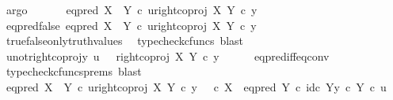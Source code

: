 \begin{isabellebody}
\ argo\isanewline
\ \ \isamarkupfalse%
\isanewline
{}\isamarkupfalse%
\isanewline
\ \ \isamarkupfalse%
\ {\isachardoublequoteopen}eq{\isacharunderscore}{\kern0pt}pred\ {\isacharparenleft}{\kern0pt}X\ {\isasymCoprod}\ Y{\isacharparenright}{\kern0pt}\ {\isasymcirc}\isactrlsub c\ {\isasymlangle}u{\isacharcomma}{\kern0pt}right{\isacharunderscore}{\kern0pt}coproj\ X\ Y\ {\isasymcirc}\isactrlsub c\ y{\isasymrangle}\ {\isasymnoteq}\ {\isasymt}{\isachardoublequoteclose}\isanewline
\ \ \isamarkupfalse%
\ \isamarkupfalse%
\ eq{\isacharunderscore}{\kern0pt}pred{\isacharunderscore}{\kern0pt}false{\isacharcolon}{\kern0pt}\ {\isachardoublequoteopen}eq{\isacharunderscore}{\kern0pt}pred\ {\isacharparenleft}{\kern0pt}X\ {\isasymCoprod}\ Y{\isacharparenright}{\kern0pt}\ {\isasymcirc}\isactrlsub c\ {\isasymlangle}u{\isacharcomma}{\kern0pt}right{\isacharunderscore}{\kern0pt}coproj\ X\ Y\ {\isasymcirc}\isactrlsub c\ y{\isasymrangle}\ {\isacharequal}{\kern0pt}\ {\isasymf}{\isachardoublequoteclose}\isanewline
\ \ \ \ \isamarkupfalse%
\ true{\isacharunderscore}{\kern0pt}false{\isacharunderscore}{\kern0pt}only{\isacharunderscore}{\kern0pt}truth{\isacharunderscore}{\kern0pt}values\ \isamarkupfalse%
\ {\isacharparenleft}{\kern0pt}typecheck{\isacharunderscore}{\kern0pt}cfuncs{\isacharcomma}{\kern0pt}\ blast{\isacharparenright}{\kern0pt}\isanewline
\ \ \isamarkupfalse%
\ \isamarkupfalse%
\ u{\isacharunderscore}{\kern0pt}not{\isacharunderscore}{\kern0pt}right{\isacharunderscore}{\kern0pt}coproj{\isacharunderscore}{\kern0pt}y{\isacharcolon}{\kern0pt}\ {\isachardoublequoteopen}u\ \ {\isasymnoteq}\ right{\isacharunderscore}{\kern0pt}coproj\ X\ Y\ {\isasymcirc}\isactrlsub c\ y{\isachardoublequoteclose}\isanewline
\ \ \ \ \isamarkupfalse%
\ eq{\isacharunderscore}{\kern0pt}pred{\isacharunderscore}{\kern0pt}iff{\isacharunderscore}{\kern0pt}eq{\isacharunderscore}{\kern0pt}conv\ \isamarkupfalse%
\ {\isacharparenleft}{\kern0pt}typecheck{\isacharunderscore}{\kern0pt}cfuncs{\isacharunderscore}{\kern0pt}prems{\isacharcomma}{\kern0pt}\ blast{\isacharparenright}{\kern0pt}\isanewline
\isanewline
\ \ \isamarkupfalse%
\ {\isachardoublequoteopen}eq{\isacharunderscore}{\kern0pt}pred\ {\isacharparenleft}{\kern0pt}X\ {\isasymCoprod}\ Y{\isacharparenright}{\kern0pt}\ {\isasymcirc}\isactrlsub c\ {\isasymlangle}u{\isacharcomma}{\kern0pt}right{\isacharunderscore}{\kern0pt}coproj\ X\ Y\ {\isasymcirc}\isactrlsub c\ y{\isasymrangle}\ {\isacharequal}{\kern0pt}\ {\isacharparenleft}{\kern0pt}{\isasymf}\ {\isasymcirc}\isactrlsub c\ {\isasymbeta}\isactrlbsub X\isactrlesub {\isacharparenright}{\kern0pt}\ {\isasymamalg}\ {\isacharparenleft}{\kern0pt}eq{\isacharunderscore}{\kern0pt}pred\ Y\ {\isasymcirc}\isactrlsub c\ {\isasymlangle}id\isactrlsub c\ Y{\isacharcomma}{\kern0pt}y\ {\isasymcirc}\isactrlsub c\ {\isasymbeta}\isactrlbsub Y\isactrlesub {\isasymrangle}{\isacharparenright}{\kern0pt}\ {\isasymcirc}\isactrlsub c\ u{\isachardoublequoteclose}\isanewline

\end{isabellebody}
